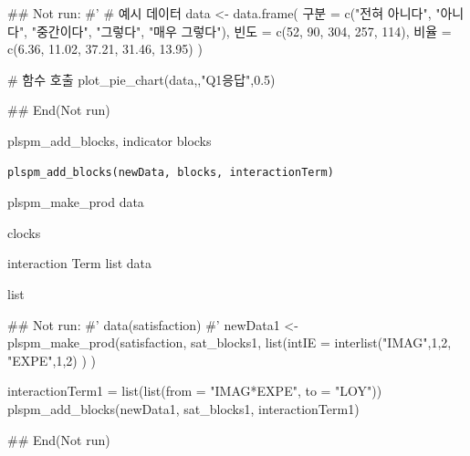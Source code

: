\documentclass[a4paper]{book}
\begin{document}
%
\begin{Examples}
\begin{ExampleCode}

\#\# Not run: 
#'
# 예시 데이터
data <- data.frame(
  구분 = c("전혀 아니다", "아니다", "중간이다", "그렇다", "매우 그렇다"),
  빈도 = c(52, 90, 304, 257, 114),
  비율 = c(6.36, 11.02, 37.21, 31.46, 13.95)
)

# 함수 호출
plot_pie_chart(data,,"Q1응답",0.5)

## End(Not run)

\end{ExampleCode}
\end{Examples}
%
\begin{Description}
plspm\_add\_blocks, indicator blocks
\end{Description}
%
\begin{Usage}
\begin{verbatim}
plspm_add_blocks(newData, blocks, interactionTerm)
\end{verbatim}
\end{Usage}
%
\begin{Arguments}
\begin{ldescription}
\item[\code{newData}] plspm\_make\_prod data

\item[\code{blocks}] clocks

\item[\code{interactionTerm}] interaction Term list data
\end{ldescription}
\end{Arguments}
%
\begin{Value}
list
\end{Value}
%
\begin{Examples}
\begin{ExampleCode}
\#\# Not run: 
#' data(satisfaction)
#'
newData1 <- plspm_make_prod(satisfaction, sat_blocks1,
                            list(intIE = interlist("IMAG",1,2, "EXPE",1,2) ) )


interactionTerm1 = list(list(from = "IMAG*EXPE", to = "LOY"))
plspm_add_blocks(newData1, sat_blocks1, interactionTerm1)


## End(Not run)

\end{ExampleCode}
\end{Examples}
\end{document}
